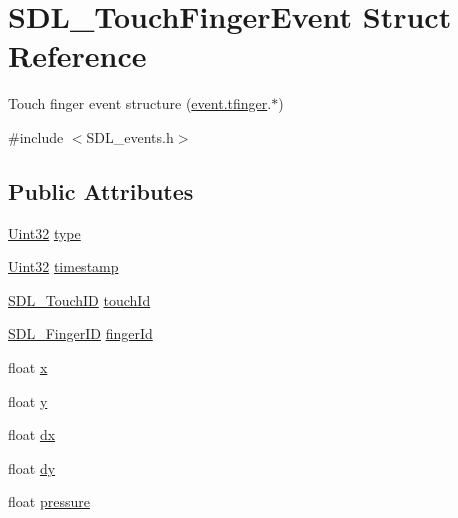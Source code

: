 \hypertarget{struct_s_d_l___touch_finger_event}{}\section{S\+D\+L\+\_\+\+Touch\+Finger\+Event Struct Reference}
\label{struct_s_d_l___touch_finger_event}


Touch finger event structure (\hyperlink{union_s_d_l___event_ab18d7d60794cb056948ffa58541bc3c5}{event.\+tfinger}.$\ast$)  




{\ttfamily \#include $<$S\+D\+L\+\_\+events.\+h$>$}

\subsection*{Public Attributes}
\begin{DoxyCompactItemize}
\item 
\hyperlink{_s_d_l__stdinc_8h_add440eff171ea5f55cb00c4a9ab8672d}{Uint32} \hyperlink{struct_s_d_l___touch_finger_event_a3883218fa3426065ca66086c100edbfa}{type}
\item 
\hyperlink{_s_d_l__stdinc_8h_add440eff171ea5f55cb00c4a9ab8672d}{Uint32} \hyperlink{struct_s_d_l___touch_finger_event_abde2ab5cb013bbd21e37a65e2f8fa666}{timestamp}
\item 
\hyperlink{_s_d_l__touch_8h_a10f5f86abe4ea8308a8706bd5d3b337a}{S\+D\+L\+\_\+\+Touch\+ID} \hyperlink{struct_s_d_l___touch_finger_event_ad7a6f39ec9af1bf47b160d18314edd70}{touch\+Id}
\item 
\hyperlink{_s_d_l__touch_8h_a5fa58141f78415ca09645af359ad2250}{S\+D\+L\+\_\+\+Finger\+ID} \hyperlink{struct_s_d_l___touch_finger_event_a8616d46ed19906e3ee90a4d481d3a284}{finger\+Id}
\item 
float \hyperlink{struct_s_d_l___touch_finger_event_a0ce44b1342220fa17e9b9b4a77c2c906}{x}
\item 
float \hyperlink{struct_s_d_l___touch_finger_event_ac2bb8af638d2927a8e13f6ffe8f9384e}{y}
\item 
float \hyperlink{struct_s_d_l___touch_finger_event_ac6acac209d6e2bd659fdb6760081393d}{dx}
\item 
float \hyperlink{struct_s_d_l___touch_finger_event_a9c0320c5f18a6b9d10da657e166608c9}{dy}
\item 
float \hyperlink{struct_s_d_l___touch_finger_event_ab4fca822d0807b5748dbae8d3cc56524}{pressure}
\end{DoxyCompactItemize}


